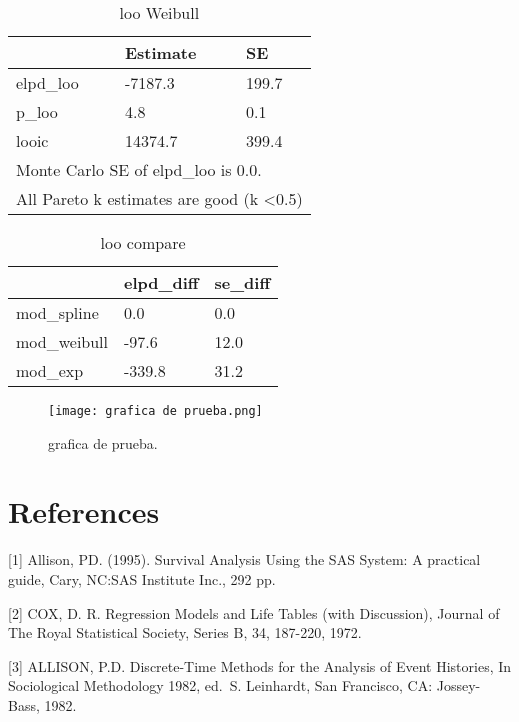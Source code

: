 \documentclass[
  twocolumn]{article}
\begin{document}
\begin{table}[h!]
\begin{center}
\begin{tabular}{|lll|}
\hline
\multicolumn{1}{|l|}{}          & \multicolumn{1}{l|}{Estimate} & SE    \\ \hline
\multicolumn{1}{|l|}{elpd\_loo} & \multicolumn{1}{l|}{-7187.3}  & 199.7 \\ \hline
\multicolumn{1}{|l|}{p\_loo}    & \multicolumn{1}{l|}{4.8}      & 0.1  \\ \hline
\multicolumn{1}{|l|}{looic}     & \multicolumn{1}{l|}{14374.7}  & 399.4 \\ \hline
\multicolumn{3}{|l|}{Monte Carlo SE of elpd\_loo is 0.0.}               \\ \hline
\multicolumn{3}{|l|}{All Pareto k estimates are good (k \textless 0.5)} \\ \hline
\end{tabular}
\caption{loo Weibull}
\end{center}
\end{table}

\begin{table}[h!]
\begin{center}
\begin{tabular}{|l|l|l|}
\hline
             & elpd\_diff & se\_diff \\ \hline
mod\_spline  & 0.0        & 0.0      \\ \hline
mod\_weibull & -97.6      & 12.0     \\ \hline
mod\_exp     & -339.8     & 31.2     \\ \hline
\end{tabular}
\caption{loo compare}
\end{center}
\end{table}

\begin{figure}[ht]
\centering
\texttt{[image: grafica de prueba.png]}
\caption{grafica de prueba.}
\label{fig:foo}
\end{figure}

\newpage

\hypertarget{references}{%
\section{References}\label{references}}

{[}1{]} Allison, PD. (1995). Survival Analysis Using the SAS System: A
practical guide, Cary, NC:SAS Institute Inc., 292 pp.

{[}2{]} COX, D. R. Regression Models and Life Tables (with Discussion),
Journal of The Royal Statistical Society, Series B, 34, 187-220, 1972.

{[}3{]} ALLISON, P.D. Discrete-Time Methods for the Analysis of Event
Histories, In Sociological Methodology 1982, ed.~S. Leinhardt, San
Francisco, CA: Jossey-Bass, 1982.
\end{document}
